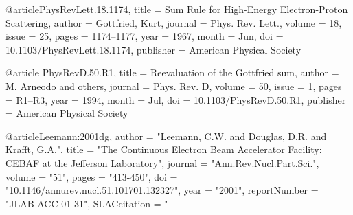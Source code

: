 @article{PhysRevLett.18.1174,
  title = {Sum Rule for High-Energy Electron-Proton Scattering},
  author = {Gottfried, Kurt},
  journal = {Phys. Rev. Lett.},
  volume = {18},
  issue = {25},
  pages = {1174--1177},
  year = {1967},
  month = {Jun},
  doi = {10.1103/PhysRevLett.18.1174},
  publisher = {American Physical Society}
}

@article{ PhysRevD.50.R1,
  title = {Reevaluation of the Gottfried sum},
  author = {M. Arneodo and others},
  journal = {Phys. Rev. D},
  volume = {50},
  issue = {1},
  pages = {R1--R3},
  year = {1994},
  month = {Jul},
  doi = {10.1103/PhysRevD.50.R1},
  publisher = {American Physical Society}
}

@article{Leemann:2001dg,
      author         = "Leemann, C.W. and Douglas, D.R. and Krafft, G.A.",
      title          = "{The Continuous Electron Beam Accelerator Facility: CEBAF
                        at the Jefferson Laboratory}",
      journal        = "Ann.Rev.Nucl.Part.Sci.",
      volume         = "51",
      pages          = "413-450",
      doi            = "10.1146/annurev.nucl.51.101701.132327",
      year           = "2001",
      reportNumber   = "JLAB-ACC-01-31",
      SLACcitation   = "%
}

